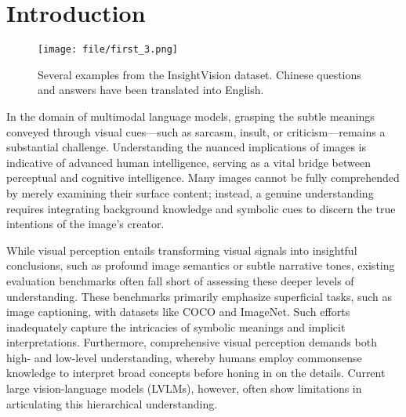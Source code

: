 \section{Introduction}
\label{sec:intro}
\begin{figure}[t]
    \centering
    \texttt{[image: file/first\_3.png]}
    
    \caption{Several examples from the InsightVision dataset. Chinese questions and answers have been translated into English.}
    \label{fig:example}
\end{figure}

In the domain of multimodal language models\cite{achiam2023gpt, li2024llava,you2023ferretrefergroundgranularity}, grasping the subtle meanings conveyed through visual cues—such as sarcasm, insult, or criticism—remains a substantial challenge. Understanding the nuanced implications of images is indicative of advanced human intelligence, serving as a vital bridge between perceptual and cognitive intelligence\cite{gordon2019intermodulation,DEWIT2012665}. Many images cannot be fully comprehended by merely examining their surface content; instead, a genuine understanding requires integrating background knowledge and symbolic cues to discern the true intentions of the image's creator\cite{garner1987metacognition,wang2024browseconcentratecomprehendingmultimodal}.

While visual perception entails transforming visual signals into insightful conclusions, such as profound image semantics or subtle narrative tones, existing evaluation benchmarks often fall short of assessing these deeper levels of understanding\cite{Goyal_2017_CVPR, Hiippala_2020}. These benchmarks primarily emphasize superficial tasks, such as image captioning, with datasets like COCO and ImageNet\cite{Hudson_2019_CVPR, cai2019multi}. Such efforts inadequately capture the intricacies of symbolic meanings and implicit interpretations. Furthermore, comprehensive visual perception demands both high- and low-level understanding, whereby humans employ commonsense knowledge to interpret broad concepts before honing in on the details\cite{wang2024browseconcentratecomprehendingmultimodal,chow2023travlritdontbimodal}. Current large vision-language models (LVLMs), however, often show limitations in articulating this hierarchical understanding.

